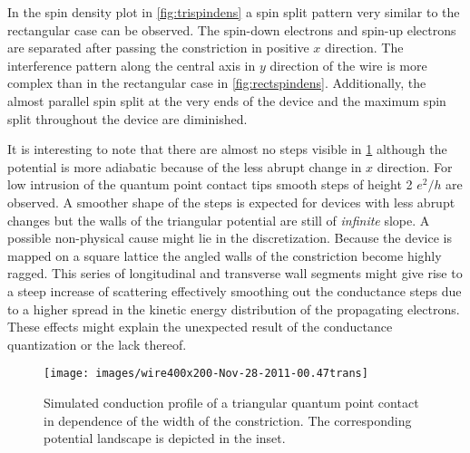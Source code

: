 In the spin density plot in \cref{fig:trispindens} a spin split pattern very similar to the rectangular case can be observed. The spin-down electrons and spin-up electrons are separated after passing the constriction in positive $x$ direction. The interference pattern along the central axis in $y$ direction of the wire is more complex than in the rectangular case in \cref{fig:rectspindens}. Additionally, the almost parallel spin split at the very ends of the device and the maximum spin split throughout the device are diminished.\par
It is interesting to note that there are almost no steps visible in \cref{fig:tritrans} although the potential is more adiabatic because of the less abrupt change in $x$ direction. For low intrusion of the quantum point contact tips smooth steps of height 2 $e^2/h$ are observed. A smoother shape of the steps is expected for devices with less abrupt changes but the walls of the triangular potential are still of \emph{infinite} slope. A possible non-physical cause might lie in the discretization. Because the device is mapped on a square lattice the angled walls of the constriction become highly ragged. This series of longitudinal and transverse wall segments might give rise to a steep increase of scattering effectively smoothing out the conductance steps due to a higher spread in the kinetic energy distribution of the propagating electrons. These effects might explain the unexpected result of the conductance quantization or the lack thereof.\par
\begin{figure}[h]
  \centering
  \texttt{[image: images/wire400x200-Nov-28-2011-00.47trans]}
  \caption{Simulated conduction profile of a triangular quantum point contact in dependence of the width of the constriction. The corresponding potential landscape is depicted in the inset.}\label{fig:tritrans}
\end{figure}
\FloatBarrier
